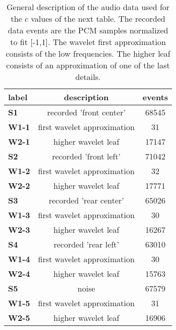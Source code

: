\begin{table}[h!]
\begin{center}
\begin{tabular}{| l || c | c |}\hline
label & description & events \\\hline\hline
{\bf S1} & recorded 'front center' & 68545 \\\hline
{\bf W1-1} & first wavelet approximation & 31 \\\hline
{\bf W2-1} & higher wavelet leaf & 17147 \\\hline
{\bf S2} & recorded 'front left' & 71042 \\\hline
{\bf W1-2} & first wavelet approximation & 32 \\\hline
{\bf W2-2} & higher wavelet leaf & 17771 \\\hline
{\bf S3} & recorded 'rear center' & 65026 \\\hline
{\bf W1-3} & first wavelet approximation & 30 \\\hline
{\bf W2-3} & higher wavelet leaf & 16267 \\\hline
{\bf S4} & recorded 'rear left' & 63010 \\\hline
{\bf W1-4} & first wavelet approximation & 30 \\\hline
{\bf W2-4} & higher wavelet leaf & 15763 \\\hline
{\bf S5} & noise & 67579 \\\hline
{\bf W1-5} & first wavelet approximation & 31 \\\hline
{\bf W2-5} & higher wavelet leaf & 16906 \\\hline
\end{tabular}
\caption{General description of the audio data used for the $c$ values of the next table.
The recorded data events are the PCM samples normalized to fit [-1,1].
The wavelet first approximation consists of the low frequencies.
The higher leaf consists of an approximation of one of the last details.}
\end{center}
\end{table}